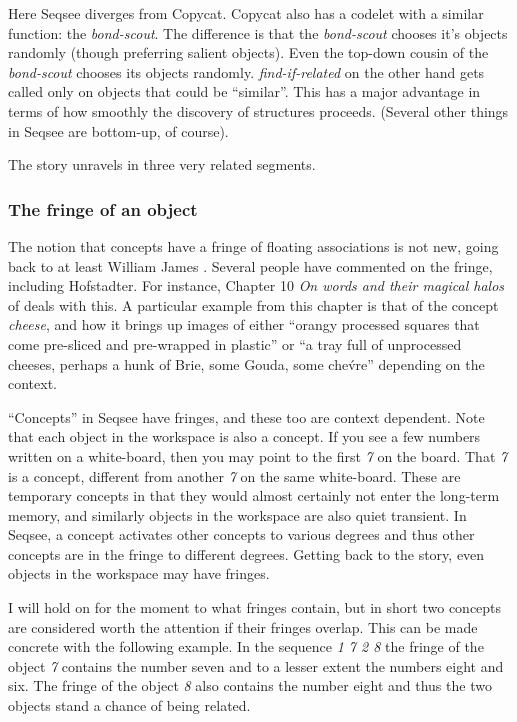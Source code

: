 \documentclass[letterpaper]{article}
\begin{document}
Here Seqsee diverges from Copycat.  Copycat also has a codelet with a similar function: the \emph{bond-scout}.  The difference is that the \emph{bond-scout} chooses it's objects randomly (though preferring salient objects).  Even the top-down cousin of the \emph{bond-scout} chooses its objects randomly.  \emph{find-if-related} on the other hand gets called only on objects that could be ``similar''.  This has a major advantage in terms of how smoothly the discovery of structures proceeds.  (Several other things in Seqsee are bottom-up, of course).

The story unravels in three very related segments.

\subsubsection{The fringe of an object}
\label{sec:fringe}

The notion that concepts have a fringe of floating associations is not new, going back to at least William James \cite{James}.  Several people have commented on the fringe, including Hofstadter.  For instance, Chapter 10 \emph{On words and their magical halos} of  deals with this.  A particular example from this chapter is that of the concept \emph{cheese}, and how it brings up images of either ``orangy processed squares that come pre-sliced and pre-wrapped in plastic'' or ``a tray full of unprocessed cheeses, perhaps a hunk of Brie, some Gouda, some che\'vre'' depending on the context.

``Concepts'' in Seqsee have fringes, and these too are context dependent.  Note that each object in the workspace is also a concept.  If you see a few numbers written on a white-board, then you may point to the first \emph{7} on the board.  That \emph{7} is a concept, different from another \emph{7} on the same white-board.  These are temporary concepts in that they would almost certainly not enter the long-term memory, and similarly objects in the workspace are also quiet transient.  In Seqsee, a concept activates other concepts to various degrees and thus other concepts are in the fringe to different degrees. Getting back to the story, even objects in the workspace may have fringes.

I will hold on for the moment to what fringes contain, but in short two concepts are considered worth the attention if their fringes overlap.  This can be made concrete with the following example.  In the sequence \emph{1 7 2 8} the fringe of the object \emph{7} contains the number seven and to a lesser extent the numbers eight and six.  The fringe of the object \emph{8} also contains the number eight and thus the two objects stand a chance of being related.
\end{document}
